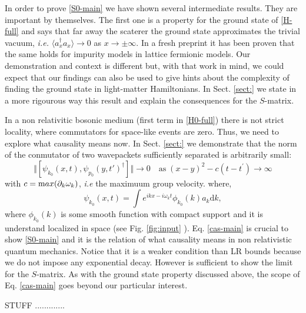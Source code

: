 \documentclass[notitlepage, prx, preprint, amsmath,superscriptaddress,amssymb]{revtex4-1}
\begin{document}
In order to prove \eqref{S0-main}   we have shown several  intermediate results.
They are important by themselves.    The first one is a property for the ground state of \eqref{H-full} and says that far away the scaterer the ground state  approximates the trivial vacuum, \emph{i.e.}  $\langle a_x^\dagger a_x \rangle \to 0$ as $x \to \pm \infty$.  
In a fresh preprint it has been proven that the same holds for impurity models in lattice fermionic models.  Our demonstration and context is  different but, with that work in mind, we could expect that our findings can also be used to give hints about the complexity of finding the ground state in light-matter Hamiltonians.  In Sect. \ref{sect:} we state in a more rigourous way this result and explain the consequences for the $S$-matrix.


In  a non relativitic bosonic medium (first term in \eqref{H0-full}) there is not strict locality, where commutators for space-like events are zero.  Thus, we need to explore what causality means now. In Sect. \ref{sect:}   we demonstrate that the norm of the  conmutator of two wavepackets sufficiently separated  is arbitrarily small:
\begin{equation}
\label{cas-main}
\Vert[\psi_{k_0}(x,t),\psi_{p_0}(y,t')^\dagger]\Vert \to 0  \quad
\text{as} \;  (x-y)^2 -c (t-t^\prime) \to \infty
\end{equation}
with $c= {\text max} ( \partial_k \omega_k )$, \emph{i.e} the maximuum group velocity.  where,
\begin{equation}
\label{wp}
\psi_{k_0}(x,t) = \int  e^{ikx-i\omega_kt} \phi_{k_0}(k) a_k\mathrm{d}k,
\end{equation}
where $\phi_{k_0} (k)$ is some smooth function with compact support and it is understand localized in space (see Fig. \ref{fig:input} ).   
Eq. \eqref{cas-main} is crucial to show \eqref{S0-main} and it is the relation of what causality means in non relativistic quantum mechanics.  Notice that it is a weaker condition than LR bounds because we do not impose any exponential decay.  However is sufficient to show the limit for the $S$-matrix.  As with the ground state property discussed above,  the scope of  Eq. \eqref{cas-main} goes beyond  our particular interest.




 STUFF .............
\end{document}
